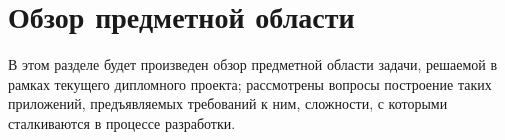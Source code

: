 \section{Обзор предметной области}
\label{sec:domain}

В этом разделе будет произведен обзор предметной области задачи, решаемой в рамках текущего дипломного проекта; рассмотрены вопросы построение таких приложений, предъявляемых требований к ним, сложности, с которыми сталкиваются в процессе разработки.



% 
%
% 
